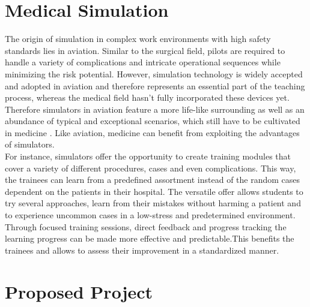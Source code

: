 \section{Medical Simulation}

The origin of simulation in complex work environments with high safety standards lies in aviation. Similar to the surgical field, pilots are required to handle a variety of complications and intricate operational sequences while minimizing the risk potential. However, simulation technology is widely accepted and adopted in aviation and therefore represents an essential part of the teaching process, whereas the medical field hasn’t fully incorporated these devices yet\parencite{pandey_expanding_2012}. Therefore simulators in aviation feature a more life-like surrounding as well as an abundance of typical and exceptional scenarios, which still have to be cultivated in medicine \parencite{niels_taatgen_procedural_2013}. Like aviation, medicine can benefit from exploiting the advantages of simulators. \\
For instance, simulators offer the opportunity to create training modules that cover a variety of different procedures, cases and even complications. This way, the trainees can learn from a predefined assortment instead of the random cases dependent on the patients in their hospital. The versatile offer allows students to try several approaches, learn from their mistakes without harming a patient and to experience uncommon cases in a low-stress and predetermined environment. Through focused training sessions, direct feedback and progress tracking the learning progress can be made more effective and predictable.This benefits the trainees and allows to assess their improvement in a standardized manner\parencite{eason_simulation_2005}\parencite{lake_simulation_2005}.

\section{Proposed Project}

